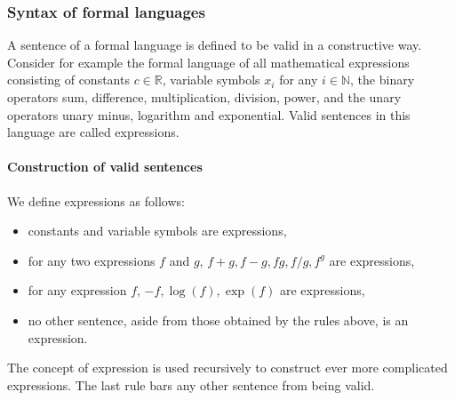 \documentclass[a4paper]{book}
\theoremstyle{changebreak}                %
\begin{document}
\subsubsection{Syntax of formal languages}
A sentence of a formal language is defined to be valid in a
constructive way. Consider for example the formal language of all
mathematical expressions consisting of
constants $c\in\mathbb{R}$, variable
symbols $x_i$ for any $i\in\mathbb{N}$, the binary
operators sum, difference, multiplication,
division, power, and the unary operators unary
minus, logarithm and exponential.  Valid sentences in this language
are called expressions.

\paragraph{Construction of valid sentences}
We define expressions as follows:
\begin{itemize}
\item constants and variable symbols are expressions,
\item for any two expressions $f$ and $g$, $f+g,f-g,fg,f/g,f^g$ are expressions,
\item for any expression $f$, $-f,\log(f),\exp(f)$ are expressions,
\item no other sentence, aside from those obtained by the rules above,
  is an expression.
\end{itemize}
The concept of expression is used recursively to construct ever more
complicated expressions. The last rule bars any other sentence from
being valid.
\end{document}
